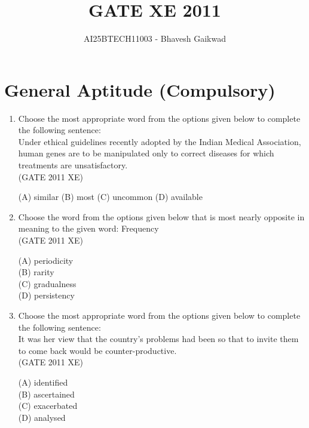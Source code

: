 \documentclass[journal,12pt,onecolumn]{IEEEtran}
\begin{document}
\title{GATE XE 2011}
\author{AI25BTECH11003 - Bhavesh Gaikwad}
\maketitle

\section*{General Aptitude (Compulsory)}
\vspace{1cm}
\begin{enumerate}[label=\textbf{Q\arabic*.},itemsep=2em]

\item Choose the most appropriate word from the options given below to complete the following sentence: \\
Under ethical guidelines recently adopted by the Indian Medical Association, human genes are to be manipulated only to correct diseases for which treatments are unsatisfactory.\\

\hfill{(GATE 2011 XE)} \\
\begin{multicols}{4}
(A) similar 
(B) most 
(C) uncommon 
(D) available
\end{multicols}

\item Choose the word from the options given below that is most nearly opposite in meaning to the given word: Frequency\\

\hfill{(GATE 2011 XE)} \\
\begin{multicols}{4}
(A) periodicity \\
(B) rarity \\
(C) gradualness \\
(D) persistency
\end{multicols}

\item Choose the most appropriate word from the options given below to complete the following sentence: \\
It was her view that the country's problems had been so that to invite them to come back would be counter-productive. \\

\hfill{(GATE 2011 XE)} \\
\begin{multicols}{4}
(A) identified \\
(B) ascertained \\
(C) exacerbated \\
(D) analysed
\end{multicols}


\end{enumerate}
\end{document}
